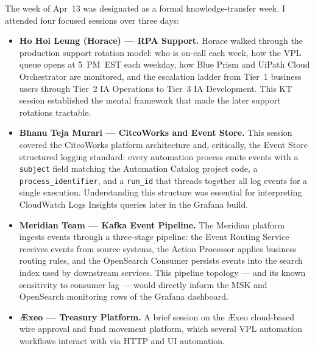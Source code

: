 The week of Apr~13 was designated as a formal knowledge-transfer week.
I attended four focused sessions over three days:

\begin{itemize}
    \item \textbf{Ho Hoi Leung (Horace) --- RPA Support.}
          Horace walked through the production support rotation model: who is
          on-call each week, how the VPL queue opens at 5~PM~EST each weekday,
          how Blue Prism and UiPath Cloud Orchestrator are monitored, and
          the escalation ladder from Tier~1 business users through Tier~2 IA
          Operations to Tier~3 IA Development. This KT session established the
          mental framework that made the later support rotations tractable.

    \item \textbf{Bhanu Teja Murari --- CitcoWorks and Event Store.}
          This session covered the CitcoWorks platform architecture and, critically,
          the Event Store structured logging standard: every automation process emits
          events with a \texttt{subject} field matching the Automation Catalog project
          code, a \texttt{process\_identifier}, and a \texttt{run\_id} that threads
          together all log events for a single execution. Understanding this structure
          was essential for interpreting CloudWatch Logs Insights queries later in the
          Grafana build.

    \item \textbf{Meridian Team --- Kafka Event Pipeline.}
          The Meridian platform ingests events through a three-stage pipeline: the
          Event Routing Service receives events from source systems, the Action
          Processor applies business routing rules, and the OpenSearch Consumer
          persists events into the search index used by downstream services. This
          pipeline topology --- and its known sensitivity to consumer lag --- would
          directly inform the MSK and OpenSearch monitoring rows of the Grafana
          dashboard.

    \item \textbf{\AE xeo --- Treasury Platform.}
          A brief session on the \AE xeo cloud-based wire approval and fund movement
          platform, which several VPL automation workflows interact with via HTTP
          and UI automation.
\end{itemize}

